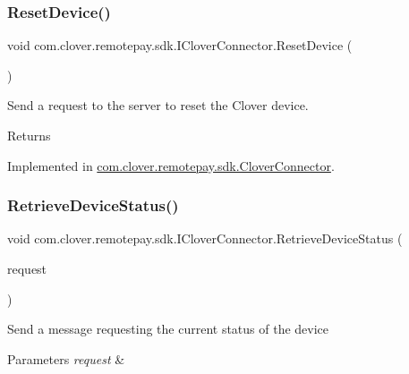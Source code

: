 \subsubsection{\texorpdfstring{Reset\+Device()}{ResetDevice()}}
{\footnotesize\ttfamily void com.\+clover.\+remotepay.\+sdk.\+I\+Clover\+Connector.\+Reset\+Device (\begin{DoxyParamCaption}{ }\end{DoxyParamCaption})}



Send a request to the server to reset the Clover device. 

\begin{DoxyReturn}{Returns}

\end{DoxyReturn}


Implemented in \hyperlink{classcom_1_1clover_1_1remotepay_1_1sdk_1_1_clover_connector_a422575429ff010ed302c57eb5542c35f}{com.\+clover.\+remotepay.\+sdk.\+Clover\+Connector}.

\mbox{\label{interfacecom_1_1clover_1_1remotepay_1_1sdk_1_1_i_clover_connector_a172b1a191a58f1f0e4dcc0a8dc7eae48}} 
\subsubsection{\texorpdfstring{Retrieve\+Device\+Status()}{RetrieveDeviceStatus()}}
{\footnotesize\ttfamily void com.\+clover.\+remotepay.\+sdk.\+I\+Clover\+Connector.\+Retrieve\+Device\+Status (\begin{DoxyParamCaption}\item[{Retrieve\+Device\+Status\+Request}]{request }\end{DoxyParamCaption})}



Send a message requesting the current status of the device 


\begin{DoxyParams}{Parameters}
{\em request} & \\
\hline
\end{DoxyParams}


